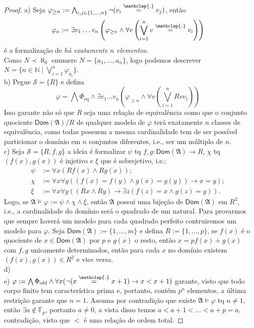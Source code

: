 \documentclass[11pt]{article}
\theoremstyle{definition}
\newcommand{\mc}[1]{\mathcal{#1}}
\newcommand{\mf}[1]{\mathfrak{#1}}
\newcommand{\msf}[1]{\mathsf{#1}}
\newcommand{\mbb}[1]{\mathbb{#1}}
\newcommand\overtext[2]{\stackrel{\mathclap{\normalfont\mbox{#1}}}{#2}}
\begin{document}
\begin{proof}
    a) Seja $\varphi_{\ge n}:=\bigwedge_{i,j\in\{1,\dots,n\}}\neg(v_i\overtext{.}{=}v_j)$, então $$\varphi_n:=\exists v_1\dots v_n\left(\varphi_{\ge n}\wedge\forall v\left(\bigvee_{i=1}^n v\overtext{.}{=} v_i\right)\right)$$ é a formalização de \textit{há exatamente $n$ elementos}.\\
    Como $N\prec\aleph_0$ enumere $N=\{a_1,\dots,a_n\}$, logo podemos descrever $N=\bigl\{n\in\mbb{N}\mid\bigvee_{i=1}^n\varphi_{a_i}\bigr\}$.\\
    b) Pegue $\mc{S}=\{R\}$ e defina $$\varphi=\bigwedge\Phi_\text{eq}\wedge\exists v_1\dots v_n\left(\varphi_{\ge n}\wedge\forall v\left(\bigvee_{i=1}^nRvv_i\right)\right)$$
    Isso garante não só que $R$ seja uma relação de equivalência como que o conjunto quociente $\msf{Dom}(\mf{A})/R$ de qualquer modelo de $\varphi$ terá exatamente $n$ classes de equivalência, como todas possuem a mesma cardinalidade tem de ser possível particionar o domínio em $n$ conjuntos diferentes, i.e., ser um múltiplo de $n$.\\
    c) Seja $\mc{S}=\{R,f,g\}$ a ideia é formalizar $\psi$ tq $f,g:\msf{Dom}(\mf{A})\to R$, $\chi$ tq $(f(x),g(x))$ é injetivo e $\xi$ que é sobrejetivo, i.e.:
    \begin{align*}
        \psi & := \forall x(Rf(x)\wedge Rg(x));\\
        \chi & := \forall x\forall y((f(x)=f(y)\wedge g(x)=g(y))\rightarrow x=y);\\
        \xi & := \forall x\forall y((Rx\wedge Ry)\rightarrow\exists z(f(z)=x\wedge g(z)=y)).
    \end{align*}
    Logo, se $\mf{A}\vDash\varphi:=\psi\wedge\chi\wedge\xi$, então $\mf{A}$ possui uma bijeção de $\msf{Dom}(\mf{A})$ em $R^2$, i.e., a cardinalidade do domínio será o quadrado de um natural. Para provarmos que sempre haverá um modelo para cada quadrado perfeito contruiremos um modelo para $\varphi$. Seja $\msf{Dom}(\mf{A}):=\{1,\dots,m\}$ e defina $R:=\{1,\dots,p\}$, se $f(x)$ é o quociente de $x\in\msf{Dom}(\mf{A})$ por $p$ e $g(x)$ o resto, então $x=pf(x)+g(x)$ com $f,g$ unicamente determinados, então para cada $x$ no domínio existem $(f(x),g(x))\in R^2$ e vice versa.\\
    d) \textbf{\color{red}{PENDENTE}}\\
    e) $\varphi:=\bigwedge\Phi_\text{ofd}\wedge\forall x(\neg(x\overtext{.}{=}x+1)\rightarrow x<x+1)$ garante, visto que todo corpo finito tem característica prima e, portanto, contém $p^n$ elementos, a última restrição garante que $n=1$. Assuma por contradição que existe $\mf{A}\vDash\varphi$ tq $n\ne1$, então $\exists a\notin\mbb{F}_p$, portanto $a\ne0$, a vista disso temos $a<a+1<\dots<a+p=a$, contradição, visto que $<$ é uma relação de ordem total.
\end{proof}
\end{document}
